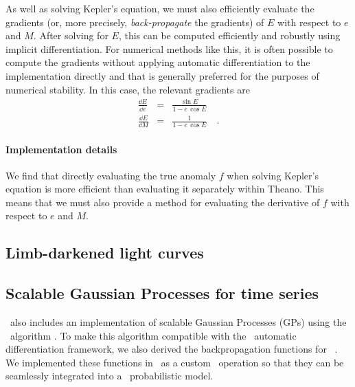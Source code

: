 \documentclass[modern]{aastex62}
\begin{document}
As well as solving Kepler's equation, we must also efficiently evaluate the
gradients (or, more precisely, \emph{back-propagate} the gradients) of $E$
with respect to $e$ and $M$.
After solving for $E$, this can be computed efficiently and robustly using
implicit differentiation.
For numerical methods like this, it is often possible to compute the gradients
without applying automatic differentiation to the implementation directly and
that is generally preferred for the purposes of numerical stability.
In this case, the relevant gradients are
\begin{eqnarray}
\frac{\dd E}{\dd e} &=& \frac{\sin E}{1 - e\,\cos E} \\
\frac{\dd E}{\dd M} &=& \frac{1}{1 - e\,\cos E} \quad.
\end{eqnarray}

\paragraph{Implementation details}

We find that directly evaluating the true anomaly $f$
when solving Kepler's equation is more efficient than evaluating it separately
within Theano.
This means that we must also provide a method for evaluating the derivative of
$f$ with respect to $e$ and $M$.


\subsection{Limb-darkened light curves}

\subsection{Scalable Gaussian Processes for time series}

\exoplanet\ also includes an implementation of scalable Gaussian Processes (GPs) using the \celerite\ algorithm \citep{Foreman-Mackey:2017}.
To make this algorithm compatible with the \theano\ automatic differentiation framework, we also derived the backpropagation functions for \celerite\ \citep{Foreman-Mackey:2018a}.
We implemented these functions in \cpp\ as a custom \theano\ operation so that they can be seamlessly integrated into a \pymc\ probabilistic model.
\end{document}
